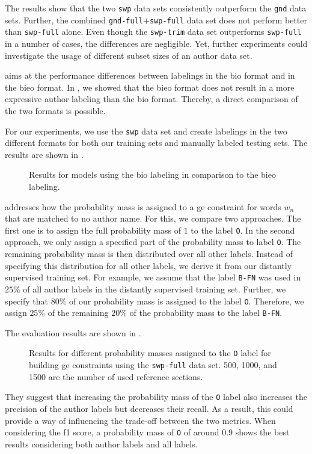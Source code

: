 The results show that the two \texttt{swp} data sets consistently outperform the \texttt{gnd} data sets.
Further, the combined \texttt{gnd-full}+\texttt{swp-full} data set does not perform better than \texttt{swp-full} alone.
Even though the \texttt{swp-trim} data set outperforms \texttt{swp-full} in a number of cases, the differences are negligible.
Yet, further experiments could investigate the usage of different subset sizes of an author data set.

\bigskip

 aims at the performance differences between labelings in the \gls{bio} format and in the \gls{bieo} format.
In , we showed that the \gls{bieo} format does not result in a more expressive author labeling than the \gls{bio} format.
Thereby, a direct comparison of the two formats is possible.

For our experiments, we use the \texttt{swp} data set and create labelings in the two different formats for both our training sets and manually labeled testing sets.
The results are shown in .
\begin{figure}

\caption{Results for models using the \gls{bio} labeling in comparison to the \gls{bieo} labeling.}
\label{fig:eval-end-tags}
\end{figure}

\bigskip

 addresses how the probability mass is assigned to a \gls{ge} constraint for words $w_n$ that are matched to no author name.
For this, we compare two approaches.
The first one is to assign the full probability mass of $1$ to the label \texttt{O}.
In the second approach, we only assign a specified part of the probability mass to label \texttt{O}.
The remaining probability mass is then distributed over all other labels.
Instead of specifying this distribution for all other labels, we derive it from our distantly supervised training set.
For example, we assume that the label \texttt{B-FN} was used in $25\%$ of all author labels in the distantly supervised training set.
Further, we specify that $80\%$ of our probability mass is assigned to the label \texttt{O}.
Therefore, we assign $25\%$ of the remaining $20\%$ of the probability mass to the label \texttt{B-FN}.

The evaluation results are shown in .
\begin{figure}

\caption{Results for different probability masses assigned to the \texttt{O} label for building \gls{ge} constraints using the \texttt{swp-full} data set. 500, 1000, and 1500 are the number of used reference sections.}
\label{fig:eval-other-percentages}
\end{figure}
They suggest that increasing the probability mass of the \texttt{O} label also increases the \gls{precision} of the author labels but decreases their \gls{recall}.
As a result, this could provide a way of influencing the trade-off between the two metrics.
When considering the \gls{f1 score}, a probability mass of \texttt{O} of around 0.9 shows the best results considering both author labels and all labels.

